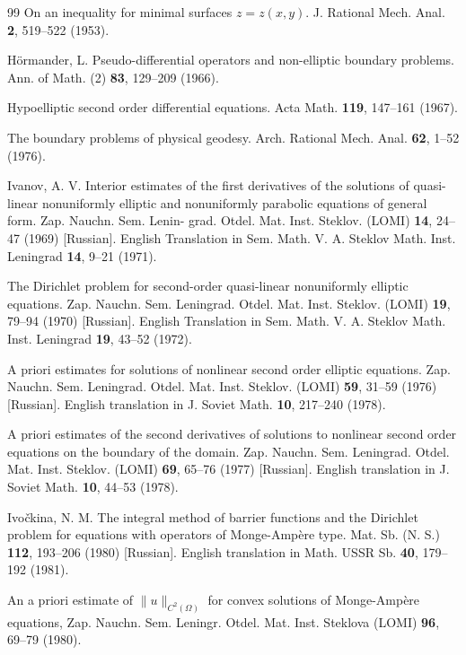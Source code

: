 \begin{thebibliography}{99}
On an inequality for minimal surfaces $z = z(x, y)$. J. Rational Mech. Anal. \textbf{2}, 519--522 (1953).

Hörmander, L.
Pseudo-differential operators and non-elliptic boundary problems. Ann. of Math. (2)
\textbf{83}, 129--209 (1966).

Hypoelliptic second order differential equations. Acta Math. \textbf{119}, 147--161 (1967).

The boundary problems of physical geodesy. Arch. Rational Mech. Anal. \textbf{62}, 1--52 (1976).

Ivanov, A. V.
Interior estimates of the first derivatives of the solutions of quasi-linear nonuniformly
elliptic and nonuniformly parabolic equations of general form. Zap. Nauchn. Sem. Lenin-
grad. Otdel. Mat. Inst. Steklov. (LOMI) \textbf{14}, 24--47 (1969) [Russian]. English Translation
in Sem. Math. V. A. Steklov Math. Inst. Leningrad \textbf{14}, 9--21 (1971).

The Dirichlet problem for second-order quasi-linear nonuniformly elliptic equations.
Zap. Nauchn. Sem. Leningrad. Otdel. Mat. Inst. Steklov. (LOMI) \textbf{19}, 79--94 (1970) [Russian].
English Translation in Sem. Math. V. A. Steklov Math. Inst. Leningrad \textbf{19}, 43--52 (1972).

A priori estimates for solutions of nonlinear second order elliptic equations. Zap. Nauchn.
Sem. Leningrad. Otdel. Mat. Inst. Steklov. (LOMI) \textbf{59}, 31--59 (1976) [Russian]. English
translation in J. Soviet Math. \textbf{10}, 217--240 (1978).

A priori estimates of the second derivatives of solutions to nonlinear second order equations
on the boundary of the domain. Zap. Nauchn. Sem. Leningrad. Otdel. Mat. Inst. Steklov.
(LOMI) \textbf{69}, 65--76 (1977) [Russian]. English translation in J. Soviet Math. \textbf{10}, 44--53 (1978).

Ivočkina, N. M.
The integral method of barrier functions and the Dirichlet problem for equations with
operators of Monge-Ampère type. Mat. Sb. (N. S.) \textbf{112}, 193--206 (1980) [Russian]. English
translation in Math. USSR Sb. \textbf{40}, 179--192 (1981).

An a priori estimate of $\|u\|_{C^2(\Omega)}$ for convex solutions of Monge-Ampère equations, Zap.
Nauchn. Sem. Leningr. Otdel. Mat. Inst. Steklova (LOMI) \textbf{96}, 69--79 (1980).

\end{thebibliography}

